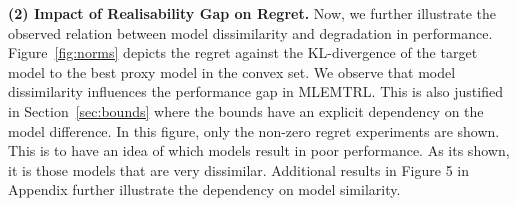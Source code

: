 
\noindent\textbf{(2) Impact of Realisability Gap on Regret.} Now, we further illustrate the observed relation between model dissimilarity and degradation in performance. Figure~\ref{fig:norms} depicts the regret against the KL-divergence of the target model to the best proxy model in the convex set. We observe that model dissimilarity influences the performance gap in MLEMTRL. This is also justified in Section~\ref{sec:bounds} where the bounds have an explicit dependency on the model difference. In this figure, only the non-zero regret experiments are shown. This is to have an idea of which models result in poor performance. As its shown, it is those models that are very dissimilar. Additional results in %
Figure 5 in Appendix further illustrate the dependency on model similarity.

\balance

